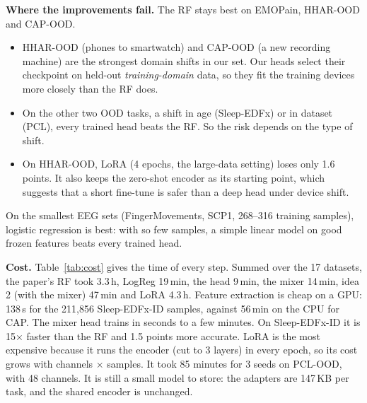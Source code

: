 \documentclass[conference]{IEEEtran}
\begin{document}
\textbf{Where the improvements fail.} The RF stays best on EMOPain, HHAR-OOD and CAP-OOD.
\begin{itemize}
\item HHAR-OOD (phones to smartwatch) and CAP-OOD (a new recording machine) are the strongest domain shifts in our set.
Our heads select their checkpoint on held-out \emph{training-domain} data, so they fit the training devices more
closely than the RF does.
\item On the other two OOD tasks, a shift in age (Sleep-EDFx) or in dataset (PCL), every trained head beats the RF.
So the risk depends on the type of shift.
\item On HHAR-OOD, LoRA (4 epochs, the large-data setting) loses only 1.6 points. It also keeps the zero-shot encoder
as its starting point, which suggests that a short fine-tune is safer than a deep head under device shift.
\end{itemize}
On the smallest EEG sets (FingerMovements, SCP1, 268--316 training samples), logistic regression is best: with so few
samples, a simple linear model on good frozen features beats every trained head.

\begin{table}[t]
\caption{Time per dataset and step (seconds; 3 seeds for each method, LogReg 1 run). Feat./Tok. = one frozen-encoder
pass for the 512-d features (RF, LogReg, Head, Mixer) or for all layers and tokens (Pool, Pool+mix); the methods are
timed with these already computed, except LoRA, which runs the encoder in every epoch. T4 GPU unless marked
$^\dagger$ (CPU-only reproduction notebook); the RF always runs on the CPU cores. -- = not recorded; CAP-ID and
CAP-OOD share one feature pass. Trainable parameters: Head/Mixer 51k--67k, Pool+mix 86k--102k, LoRA +36,864 in the
encoder.}
\label{tab:cost}
\centering
\footnotesize

\end{table}

\textbf{Cost.} Table~\ref{tab:cost} gives the time of every step. Summed over the 17 datasets, the paper's RF
took 3.3\,h, LogReg 19\,min, the head 9\,min, the mixer 14\,min, idea 2 (with the mixer) 47\,min and LoRA 4.3\,h.
Feature extraction is cheap on a GPU: 138\,s for the 211,856 Sleep-EDFx-ID samples, against 56\,min on the CPU for
CAP. The mixer head trains in seconds to a few minutes.
On Sleep-EDFx-ID it is 15$\times$ faster than the RF and 1.5 points more accurate. LoRA is the most expensive because it runs the encoder (cut to 3 layers) in every epoch, so its
cost grows with channels $\times$ samples. It took 85 minutes for 3 seeds on PCL-OOD, with 48 channels. It is still a
small model to store: the adapters are 147\,KB per task, and the shared encoder is unchanged.
\end{document}
